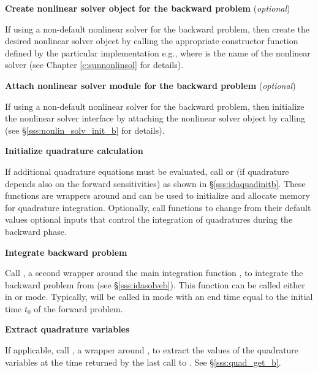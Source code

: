 \begin{Steps}
\item
  {\bf Create nonlinear solver object for the backward problem} (\textit{optional})

  If using a non-default nonlinear solver for the backward problem, then create
  the desired nonlinear solver object by calling the appropriate constructor
  function defined by the particular {\sunnonlinsol} implementation e.g.,
   where \id{***} is the name of the
  nonlinear solver (see Chapter \ref{c:sunnonlinsol} for details).

\item
  {\bf Attach nonlinear solver module for the backward problem} (\textit{optional})

  If using a non-default nonlinear solver for the backward problem, then
  initialize the nonlinear solver interface by attaching the nonlinear solver
  object by calling \\ \noindent
  (see \S\ref{sss:nonlin_solv_init_b} for details).

\item \label{i:quadB}
  {\bf Initialize quadrature calculation}

  If additional quadrature equations must be evaluated,
  call  or  (if quadrature depends also on the
  forward sensitivities) as shown in \S\ref{sss:idaquadinitb}. These functions are
  wrappers around  and can be used to initialize and allocate
  memory for quadrature integration. Optionally, call  functions
  to change from their default values optional inputs that control the integration
  of quadratures during the backward phase.

\item
  {\bf Integrate backward problem}

  Call , a second wrapper around the {\idas} main integration
  function , to integrate the backward problem from 
  (see \S\ref{sss:idasolveb}). This function can be called either in 
  or  mode. Typically,  will be called in 
  mode with an end time equal to the initial time $t_0$ of the forward problem.

\item \label{i:back_end}
  {\bf Extract quadrature variables}

  If applicable, call , a wrapper around ,
  to extract the values of the quadrature variables at the time returned
  by the last call to .  See \S\ref{sss:quad_get_b}.


\end{Steps}
